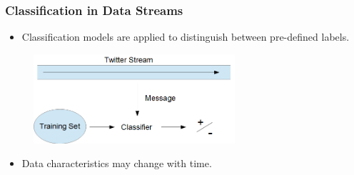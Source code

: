\documentclass[14pt]{beamer}
\begin{document}
\begin{frame}\frametitle{Classification in Data Streams}

\begin{itemize}
\item Classification models are applied to distinguish between pre-defined labels.
\end{itemize}

\vspace{-0.2in}
\begin{figure}
\centering
\includegraphics[height=1.30in]{stream1}
\end{figure}
\vspace{-0.2in}
\pause
\begin{itemize}
\item \alert{Data characteristics may change with time}.
\end{itemize}
\end{frame}
\end{document}
